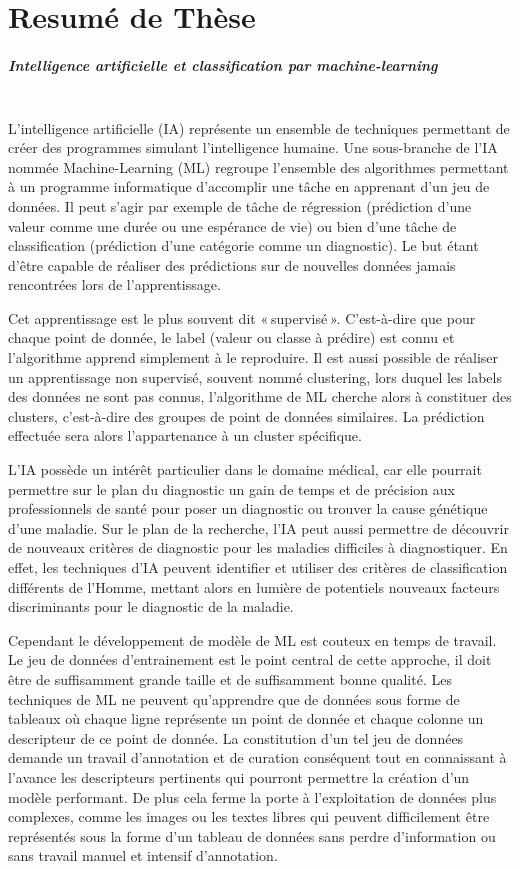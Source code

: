\chapter*{Resumé de Thèse}
\paragraph{\textbf{Intelligence artificielle et classification par machine-learning}}\mbox{}\\

L’intelligence artificielle (IA) représente un ensemble de techniques permettant de créer des programmes simulant l’intelligence humaine.  Une sous-branche de l’IA nommée Machine-Learning (ML) regroupe l’ensemble des algorithmes permettant à un programme informatique d’accomplir une tâche en apprenant d’un jeu de données. Il peut s’agir par exemple de tâche de régression (prédiction d’une valeur comme une durée ou une espérance de vie) ou bien d’une tâche de classification (prédiction d’une catégorie comme un diagnostic). Le but étant d’être capable de réaliser des prédictions sur de nouvelles données jamais rencontrées lors de l’apprentissage. 

Cet apprentissage est le plus souvent dit « supervisé ». C’est-à-dire que pour chaque point de donnée, le label (valeur ou classe à prédire) est connu et l’algorithme apprend simplement à le reproduire. Il est aussi possible de réaliser un apprentissage non supervisé, souvent nommé clustering, lors duquel les labels des données ne sont pas connus, l’algorithme de ML cherche alors à constituer des clusters, c’est-à-dire des groupes de point de données similaires. La prédiction effectuée sera alors l’appartenance à un cluster spécifique.

L’IA  possède un intérêt particulier dans le domaine médical, car elle pourrait  permettre sur le plan du diagnostic un gain de temps et de précision aux professionnels de santé pour poser un diagnostic ou trouver la cause génétique d’une maladie. Sur le plan de la recherche, l’IA peut aussi permettre de découvrir de nouveaux critères de diagnostic pour les maladies difficiles à diagnostiquer. En effet, les techniques d’IA peuvent identifier et utiliser des critères de classification différents de l’Homme, mettant alors en lumière de potentiels nouveaux facteurs discriminants pour le diagnostic de la maladie.

Cependant le développement de modèle de ML est couteux en temps de travail. Le jeu de données d’entrainement est le point central de cette approche, il doit être de suffisamment grande taille et de suffisamment bonne qualité. Les techniques de ML ne peuvent qu’apprendre que de données sous forme de tableaux où chaque ligne représente un point de donnée et chaque colonne un descripteur de ce point de donnée. La constitution d’un tel jeu de données demande un travail d’annotation et de curation conséquent tout en connaissant à l’avance les descripteurs pertinents qui pourront permettre la création d’un modèle performant. De plus cela ferme la porte à l’exploitation de données plus complexes, comme les images ou les textes libres qui peuvent difficilement être représentés sous la forme d’un tableau de données sans perdre d’information ou sans travail manuel et intensif d’annotation.

